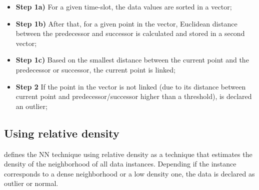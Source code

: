 \begin{itemize}

	\setlength\itemsep{-0.5em}

	\item \textbf{Step 1a)} For a given time-slot, the data values are sorted in a vector;

	\item \textbf{Step 1b)} After that, for a given point in the vector, Euclidean distance between the predecessor and successor is calculated and stored in a second vector;

	\item \textbf{Step 1c)} Based on the smallest distance between the current point and the predecessor or successor, the current point is linked;

	\item \textbf{Step 2} If the point in the vector is not linked (due to its distance between current point and predecessor/successor higher than a threshold), is declared an outlier;

\end{itemize}





\subsection{Using relative density}

\cite{gen:chandola:2009} defines the NN technique using relative density as a technique that estimates the density of the neighborhood of all data instances. Depending if the instance corresponds to a dense neighborhood or a low density one, the data is declared as outlier or normal.
